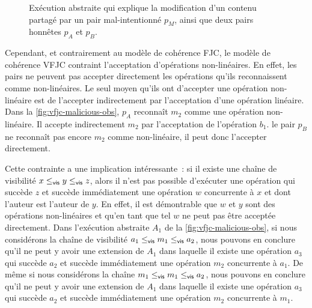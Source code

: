 \begin{figure}[htb]
\centering
{}
\caption[Opérations non-linéaires]{Exécution abstraite qui explique la modification d'un contenu partagé par un pair mal-intentionné $p_M$, ainsi que deux pairs honnêtes $p_A$ et $p_B$.}\label{fig:vfjc-malicious-obs}
\end{figure}

Cependant, et contrairement au modèle de cohérence \acl{FJC}, le modèle de cohérence \acl{VFJC} contraint l'acceptation d'opérations non-linéaires.
En effet, les pairs ne peuvent pas accepter directement les opérations qu'ils reconnaissent comme non-linéaires.
Le seul moyen qu'ils ont d'accepter une opération non-linéaire est de l'accepter indirectement par l'acceptation d'une opération linéaire.
Dans la \autoref{fig:vfjc-malicious-obs}, $p_A$ reconnaît $m_2$ comme une opération non-linéaire.
Il accepte indirectement $m_2$ par l'acceptation de l'opération $b_1$.
le pair $p_B$ ne reconnaît pas encore $m_2$ comme non-linéaire, il peut donc l'accepter directement.

Cette contrainte a une implication intéressante~: si il existe une chaîne de visibilité $x \leq_{\operatorname{\mathsf{vis}}} y \leq_{\operatorname{\mathsf{vis}}} z$, alors il n'est pas possible d'exécuter une opération qui succède $z$ et succède immédiatement une opération $w$ concurrente à $x$ et dont l'auteur est l'auteur de $y$.
En effet, il est démontrable que $w$ et $y$ sont des opérations non-linéaires et qu'en tant que tel $w$ ne peut pas être acceptée directement.
Dans l'exécution abstraite $A_1$ de la \autoref{fig:vfjc-malicious-obs}, si nous considérons la chaîne de visibilité $a_1 \leq_{\operatorname{\mathsf{vis}}} m_1 \leq_{\operatorname{\mathsf{vis}}} a_2$, nous pouvons en conclure qu'il ne peut y avoir une extension de $A_1$ dans laquelle il existe une opération $a_3$ qui succède $a_2$ et succède immédiatement une opération $m_2$ concurrente à $a_1$.
De même si nous considérons la chaîne $m_1 \leq_{\operatorname{\mathsf{vis}}} m_1 \leq_{\operatorname{\mathsf{vis}}} a_2$, nous pouvons en conclure qu'il ne peut y avoir une extension de $A_1$ dans laquelle il existe une opération $a_3$ qui succède $a_2$ et succède immédiatement une opération $m_2$ concurrente à $m_1$.

